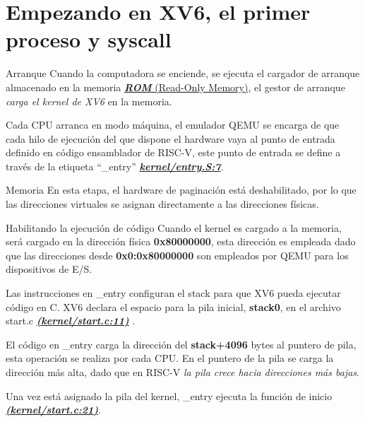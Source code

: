 \documentclass{libs/ufc_format}
\begin{document}
\section{Empezando en XV6, el primer proceso y syscall}
\begin{frame}{Arranque}
  Cuando la computadora se enciende, se ejecuta el cargador de arranque almacenado en la memoria \href{https://en.wikipedia.org/wiki/Read-only_memory}{\textit{\textbf{ROM}} (Read-Only Memory)}, el gestor de arranque \emph{carga el kernel de XV6} en la memoria.

  \vspace{0.3cm}

  Cada CPU arranca en modo máquina, el emulador QEMU se encarga de que cada hilo de ejecución del que dispone el hardware vaya al punto de entrada definido en código ensamblador de RISC-V, este punto de entrada se define a través de la etiqueta “\_entry” \href{https://github.com/CarlosSandoval-03/xv6-riscv/blob/riscv/kernel/entry.S\#L7}{\textit{\textbf{kernel/entry.S:7}}}.

  \vspace{0.1cm}

  \begin{block}{Memoria}
    En esta etapa, el hardware de paginación está deshabilitado, por lo que las direcciones virtuales se asignan directamente a las direcciones físicas.
  \end{block}
\end{frame}
\begin{frame}{Habilitando la ejecución de código}
  Cuando el kernel es cargado a la memoria, será cargado en la dirección física \textbf{0x80000000}, esta dirección es empleada dado que las direcciones desde \textbf{0x0:0x80000000} son empleados por QEMU para los dispositivos de E/S. \cite{xv6_book} \newline

  \vspace{0.3cm}

  Las instrucciones en \_entry configuran el stack para que XV6 pueda ejecutar código en C. XV6 declara el espacio para la pila inicial, \textbf{stack0}, en el archivo start.c \href{https://github.com/CarlosSandoval-03/xv6-riscv/blob/riscv/kernel/start.c\#L11}{\textit{\textbf{(kernel/start.c:11)}}} \cite{xv6_book}.
\end{frame}
\begin{frame}{}
  El código en \_entry carga la dirección del \textbf{stack+4096} bytes al puntero de pila, esta operación se realiza por cada CPU. En el puntero de la pila se carga la dirección más alta, dado que en RISC-V \emph{la pila crece hacia direcciones más bajas}.\newline

  \vspace{0.3cm}

  Una vez está asignado la pila del kernel, \_entry ejecuta la función de inicio \href{https://github.com/CarlosSandoval-03/xv6-riscv/blob/riscv/kernel/start.c\#L21}{\textbf{\textit{(kernel/start.c:21)}}}. \cite{xv6_book}
\end{frame}
\end{document}

